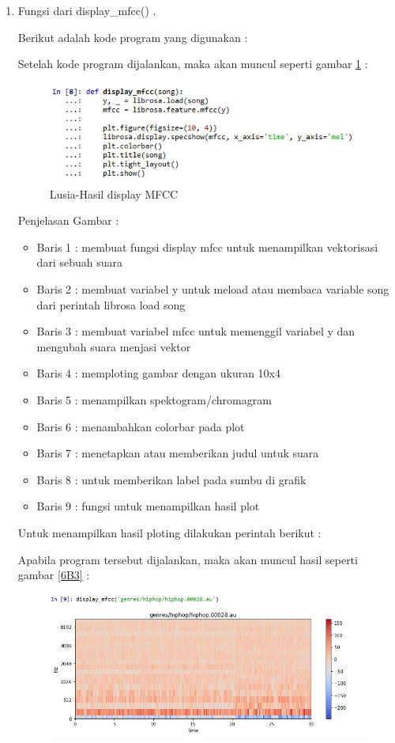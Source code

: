 \begin{enumerate}
\item Fungsi dari display\_mfcc() .
	\par Berikut adalah kode program yang digunakan :
	
	\par Setelah kode program dijalankan, maka akan muncul seperti gambar \ref{6B2} :
		\begin{figure}[!hbtp]
		\centering
		\includegraphics[scale=0.4]{figures/t2a.jpg}
		\caption{Lusia-Hasil display MFCC}
		\label{6B2}
		\end{figure}
	\par Penjelasan Gambar :
	\begin{itemize}
	\item Baris 1 : membuat fungsi display mfcc untuk menampilkan vektorisasi dari sebuah suara
	\item Baris 2 : membuat variabel y untuk meload atau membaca variable song dari perintah librosa load song
	\item Baris 3 : membuat variabel mfcc untuk memenggil variabel y dan mengubah suara menjasi vektor
	\item Baris 4 : memploting gambar dengan ukuran 10x4
	\item Baris 5 : menampilkan spektogram/chromagram
	\item Baris 6 : menambahkan colorbar pada plot
	\item Baris 7 : menetapkan atau memberikan judul untuk suara
	\item Baris 8 : untuk memberikan label pada sumbu di grafik
	\item Baris 9 : fungsi untuk menampilkan hasil plot
	\end{itemize}
	\par Untuk menampilkan hasil ploting dilakukan perintah berikut :
	
	\par Apabila program tersebut dijalankan, maka akan muncul hasil seperti gambar \ref{6B3} :
		\begin{figure}[!hbtp]
		\centering
		\includegraphics[scale=0.5]{figures/t2.jpg}

\end{figure}
\end{enumerate}
